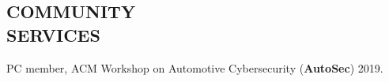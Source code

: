 \documentclass[margin]{res}
\begin{document}
\begin{resume}
\section{COMMUNITY\\ SERVICES}
PC member, ACM Workshop on Automotive Cybersecurity (\textbf{AutoSec}) 2019.
\end{resume}
\end{document}
